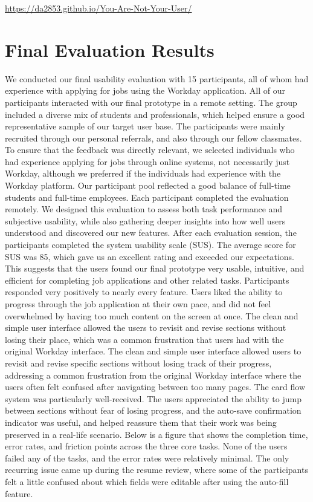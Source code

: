 \documentclass[
	letterpaper, %
]{jdf}
\begin{document}
\begin{sloppypar}
\begin{center}
    \url{https://da2853.github.io/You-Are-Not-Your-User/}
\end{center}

\newpage

\section{Final Evaluation Results}
We conducted our final usability evaluation with 15 participants, all of whom had experience with applying for jobs using the Workday application. All of our participants interacted with our final prototype in a remote setting. The group included a diverse mix of students and professionals, which helped ensure a good representative sample of our target user base. The participants were mainly recruited through our personal referrals, and also through our fellow classmates. To ensure that the feedback was directly relevant, we selected individuals who had experience applying for jobs through online systems, not necessarily just Workday, although we preferred if the individuals had experience with the Workday platform. Our participant pool reflected a good balance of full-time students and full-time employees. Each participant completed the evaluation remotely. We designed this evaluation to assess both task performance and subjective usability, while also gathering deeper insights into how well users understood and discovered our new features. After each evaluation session, the participants completed the system usability scale (SUS). The average score for SUS was 85, which gave us an excellent rating and exceeded our expectations. This suggests that the users found our final prototype very usable, intuitive, and efficient for completing job applications and other related tasks. Participants responded very positively to nearly every feature. Users liked the ability to progress through the job application at their own pace, and did not feel overwhelmed by having too much content on the screen at once. The clean and simple user interface allowed the users to revisit and revise sections without losing their place, which was a common frustration that users had with the original Workday interface. The clean and simple user interface allowed users to revisit and revise specific sections without losing track of their progress, addressing a common frustration from the original Workday interface where the users often felt confused after navigating between too many pages. The card flow system was particularly well-received. The users appreciated the ability to jump between sections without fear of losing progress, and the auto-save confirmation indicator was useful, and helped reassure them that their work was being preserved in a real-life scenario. Below is a figure that shows the completion time, error rates, and friction points across the three core tasks. None of the users failed any of the tasks, and the error rates were relatively minimal. The only recurring issue came up during the resume review, where some of the participants felt a little confused about which fields were editable after using the auto-fill feature.


\end{sloppypar}
\end{document}
